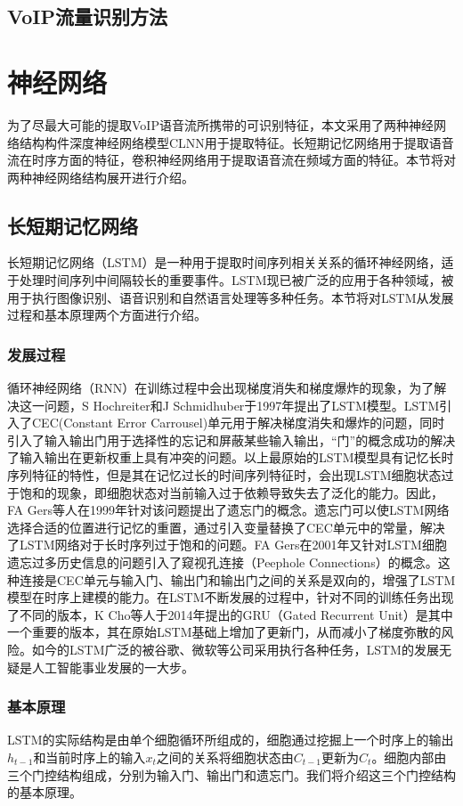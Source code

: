 \subsection{VoIP流量识别方法}

\section{神经网络}
为了尽最大可能的提取VoIP语音流所携带的可识别特征，本文采用了两种神经网络结构构件深度神经网络模型CLNN用于提取特征。长短期记忆网络用于提取语音流在时序方面的特征，卷积神经网络用于提取语音流在频域方面的特征。本节将对两种神经网络结构展开进行介绍。
\subsection{长短期记忆网络}
长短期记忆网络（LSTM）是一种用于提取时间序列相关关系的循环神经网络，适于处理时间序列中间隔较长的重要事件。LSTM现已被广泛的应用于各种领域，被用于执行图像识别、语音识别和自然语言处理等多种任务。本节将对LSTM从发展过程和基本原理两个方面进行介绍。
\subsubsection{发展过程}
循环神经网络（RNN）在训练过程中会出现梯度消失和梯度爆炸的现象，为了解决这一问题，S Hochreiter和J Schmidhuber于1997年提出了LSTM模型\supercite{lstm}。LSTM引入了CEC(Constant Error Carrousel)单元用于解决梯度消失和爆炸的问题，同时引入了输入输出门用于选择性的忘记和屏蔽某些输入输出，“门”的概念成功的解决了输入输出在更新权重上具有冲突的问题。以上最原始的LSTM模型具有记忆长时序列特征的特性，但是其在记忆过长的时间序列特征时，会出现LSTM细胞状态过于饱和的现象，即细胞状态对当前输入过于依赖导致失去了泛化的能力。因此，FA Gers等人在1999年针对该问题提出了遗忘门的概念\supercite{lstmforgetgate}。遗忘门可以使LSTM网络选择合适的位置进行记忆的重置，通过引入变量替换了CEC单元中的常量，解决了LSTM网络对于长时序列过于饱和的问题。FA Gers在2001年又针对LSTM细胞遗忘过多历史信息的问题引入了窥视孔连接（Peephole Connections）的概念\supercite{lstmpeephole}。这种连接是CEC单元与输入门、输出门和输出门之间的关系是双向的，增强了LSTM模型在时序上建模的能力。在LSTM不断发展的过程中，针对不同的训练任务出现了不同的版本，K Cho等人于2014年提出的GRU（Gated Recurrent Unit）是其中一个重要的版本，其在原始LSTM基础上增加了更新门，从而减小了梯度弥散的风险。如今的LSTM广泛的被谷歌、微软等公司采用执行各种任务，LSTM的发展无疑是人工智能事业发展的一大步。

\subsubsection{基本原理}
LSTM的实际结构是由单个细胞循环所组成的，细胞通过挖掘上一个时序上的输出$h_{t-1}$和当前时序上的输入$x_t$之间的关系将细胞状态由$C_{t-1}$更新为$C_{t}$。细胞内部由三个门控结构组成，分别为输入门、输出门和遗忘门。我们将介绍这三个门控结构的基本原理。

